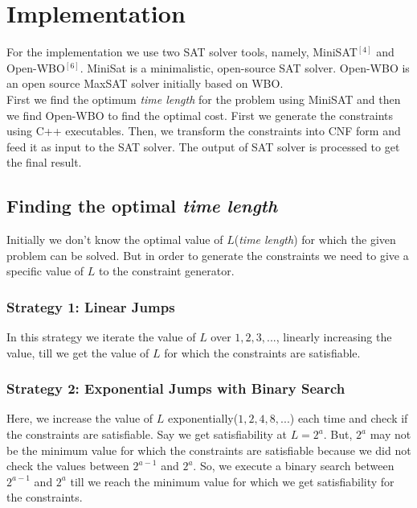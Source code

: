 \documentclass{article}[11pt]
\begin{document}
	\section{Implementation}
		For the implementation we use two SAT solver tools, namely, MiniSAT$^[4]$ and Open-WBO$^[6]$. MiniSat is a minimalistic, open-source SAT solver. Open-WBO is an open source MaxSAT solver initially based on WBO.\\
		First we find the optimum \textit{time length} for the problem using MiniSAT and then we find Open-WBO to find the optimal cost.
		First we generate the constraints using C++ executables.
		Then, we transform the constraints into CNF form and feed it as input to the SAT solver.
		The output of SAT solver is processed to get the final result.
		
		\subsection{Finding the optimal \textit{time length}}
			Initially we don't know the optimal value of $L$(\textit{time length}) for which the given problem can be solved. But in order to generate the constraints we need to give a specific value of $L$ to the constraint generator.

			\subsubsection{Strategy 1: Linear Jumps}
			In this strategy we iterate the value of $L$ over $1, 2, 3, ...$, linearly increasing the value, till we get the value of $L$ for which the constraints are satisfiable.\\
			
			\subsubsection{Strategy 2: Exponential Jumps with Binary Search}
			Here, we increase the value of $L$ exponentially($1, 2, 4, 8, ...$) each time and check if the constraints are satisfiable. Say we get satisfiability at $L = 2^a$. But, $2^a$ may not be the minimum value for which the constraints are satisfiable because we did not check the values between $2^{a-1}$ and $2^a$. So, we execute a binary search between $2^{a-1}$ and $2^a$ till we reach the minimum value for which we get satisfiability for the constraints.
\end{document}
